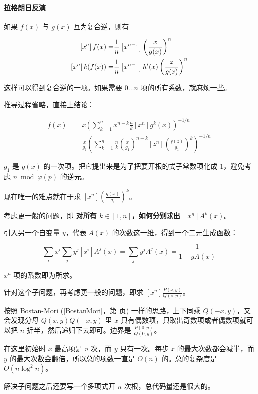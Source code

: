 \paragraph{拉格朗日反演} 如果 $f(x)$ 与 $g(x)$ 互为复合逆，则有

$$ \begin{aligned}\relax \left[x^n\right]f(x)=&\frac{1}{n}\left[x^{n-1}\right]\left(\frac{x}{g(x)}\right)^n \\
\relax \left[x^n\right]h(f(x))=&\frac{1}{n}\left[x^{n-1}\right]h'(x)\left(\frac{x}{g(x)}\right)^n\end{aligned} $$

这样可以得到复合逆的一项。如果需要 $0 \dots n$ 项的所有系数，就麻烦一些。

推导过程省略，直接上结论：

$$ \begin{aligned}
f(x) =& x \left( \sum_{k = 1} ^ n x^{n - k} \frac n k \left[ x^n \right] g^k(x) \right) ^ {- 1 / n} \\
=& \frac x {g_1} \left( \sum_{k = 1} ^ n \frac n k \left( \frac x {g_1} \right) ^ {n - k} \left[ z^n \right] \left( \frac {g(z)} {g_1} \right) ^k \right) ^ {- 1 / n}
\end{aligned} $$

$g_1$ 是 $g(x)$ 的一次项。把它提出来是为了把要开根的式子常数项化成 $1$，避免考虑 $n \bmod \varphi(p)$ 的逆元。

现在唯一的难点就在于求 $[x^n] \left( \frac {g(x)} {g_1} \right) ^ k$。

考虑更一般的问题，即 \textbf{对所有 $k \in [1, n]$，如何分别求出 $[x^n] A^k(x)$}。

引入另一个自变量 $y$，代表 $A(x)$ 的次数这一维，得到一个二元生成函数：

$$ \sum_{i} x^i \sum_{j} y^j [x^i] A^j(x) = \sum_{j} y^j A^j(x) = \frac 1 {1 - y A(x)} $$

$x^n$ 项的系数即为所求。

针对这个子问题，再考虑更一般的问题，即求 $[x^n] \frac {P(x, y)} {Q(x, y)}$。

按照 Bostan-Mori (\ref{BostanMori}，第 \pageref{BostanMori} 页) 一样的思路，上下同乘 $Q(-x, y)$，又会发现分母 $Q(x, y) Q(-x, y)$ 里 $x$ 只有偶数项，只取出奇数项或者偶数项就可以把 $n$ 折半，然后递归下去即可。边界是 $\frac {P(0, y)} {Q(0, y)}$。

在这里初始时 $x$ 最高项是 $n$ 次，而 $y$ 只有一次。每步 $x$ 的最大次数都会减半，而 $y$ 的最大次数会翻倍，所以总的项数一直是 $O(n)$ 的。总的复杂度是 $O(n \log^2 n)$。

解决子问题之后还要写一个多项式开 $n$ 次根，总代码量还是很大的。

\inputminted{cpp}{../src/math/多项式复合逆.cpp}
